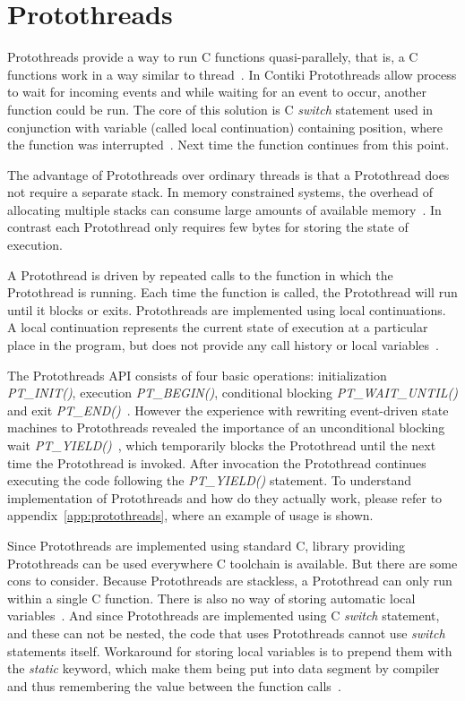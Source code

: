 
\section{Protothreads}\label{sec:contiki-protothreads}
Protothreads provide a way to run C functions quasi-parallely,
that is, a C functions work in a way similar to thread~\cite{paper-protothreads}.
In Contiki Protothreads allow process to wait for incoming events and
while waiting for an event to occur, another function could be run.
The core of this solution is C {\it switch} statement used in conjunction with variable (called local continuation)
containing position, where the function was interrupted~\cite{paper-protothreads}.
Next time the function continues from this point.

The advantage of Protothreads over ordinary threads is that a Protothread does not require a separate stack.
In memory constrained systems, the overhead of allocating multiple stacks can consume large amounts of
available memory~\cite{paper-protothreads}.
In contrast each Protothread only requires few bytes for storing the state of execution.

A Protothread is driven by repeated calls to the function in which the Protothread is running.
Each time the function is called, the Protothread will run until it blocks or exits.
Protothreads are implemented using local continuations. A local continuation represents the current state
of execution at a particular place in the program, but does not provide any call history or local variables~\cite{contiki-docs}.

The Protothreads API consists of four basic operations: initialization {\it{PT\_INIT()}}, execution {\it{PT\_BEGIN()}},
conditional blocking {\it{PT\_WAIT\_UNTIL()}} and exit {\it{PT\_END()}}~\cite{paper-protothreads}.
However the experience with rewriting event-driven state machines to Protothreads revealed
the importance of an unconditional blocking wait {\it{PT\_YIELD()}}~\cite{thesis-programming},
which temporarily blocks the Protothread until the next time the Protothread is invoked.
After invocation the Protothread continues executing the code following the {\it{PT\_YIELD()}} statement.
To understand implementation of Protothreads and how do they actually work,
please refer to appendix~\ref{app:protothreads}, where an example of usage is shown.

Since Protothreads are implemented using standard C, library providing Protothreads can be used everywhere C toolchain is available.
But there are some cons to consider. Because Protothreads are stackless, a Protothread can only run within a single C function.
There is also no way of storing automatic local variables~\cite{contiki-docs}.
And since Protothreads are implemented using C {\it switch} statement, and these can
not be nested, the code that uses Protothreads cannot use {\it switch} statements itself.
Workaround for storing local variables is to prepend them with the {\it static} keyword, which make them being put into data segment
by compiler and thus remembering the value between the function calls~\cite{paper-protothreads}.
